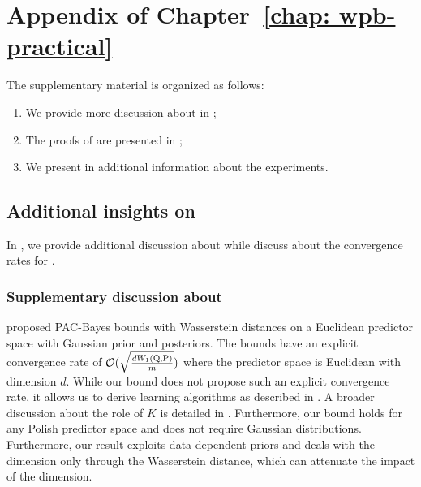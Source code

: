 \chapter{Appendix of Chapter~\ref{chap: wpb-practical}}
\label{ap: chapter-6}

\begin{noaddcontents}
    The supplementary material is organized as follows:
    \begin{enumerate}
        \item We provide more discussion about  in ;
        \item The proofs of  are presented in ;
        \item We present in  additional information about the experiments.
    \end{enumerate}
    
    \section{Additional insights on }
    \label{sec:discussion-supervised}
    
    In , we provide additional discussion about  while  discuss about the convergence rates for .
    
    \subsection{Supplementary discussion about }
    \label{sec:discussion-supervised-ht}
    
     \cite[Corollary 10]{haddouche2023wasserstein} proposed PAC-Bayes bounds with Wasserstein distances on a Euclidean predictor space with Gaussian prior and posteriors. 
     The bounds have an explicit convergence rate of $\mathcal{O}({\sqrt{\frac{d W_1(\mathrm{Q},\mathrm{P})}{m}}})$ where the predictor space is Euclidean with dimension $d$.
     While our bound does not propose such an explicit convergence rate, it allows us to derive learning algorithms as described in . 
     A broader discussion about the role of $K$ is detailed in .
     Furthermore, our bound holds for any Polish predictor space and does not require Gaussian distributions.
     Furthermore, our result exploits data-dependent priors and deals with the dimension only through the Wasserstein distance, which can attenuate the impact of the dimension. 
    

\end{noaddcontents}
